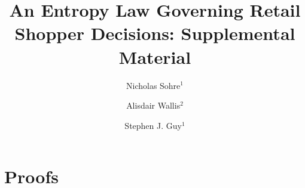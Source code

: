 \documentclass[aps,pre,groupedaddress]{revtex4-2}
\begin{document}

\title{An Entropy Law Governing Retail Shopper Decisions: Supplemental Material}


\author{Nicholas Sohre$^{1}$}
\author{Alisdair Wallis$^{2}$}
\author{Stephen J. Guy$^{1}$}

\maketitle
\appendix
\section{Proofs \label{app:proof}}
\end{document}
